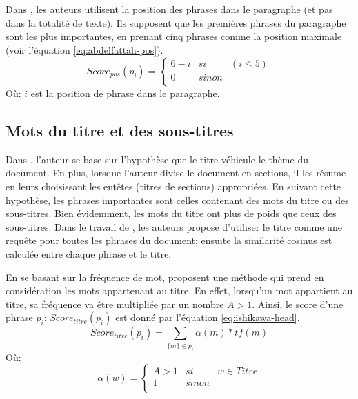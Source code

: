 \documentclass[a4paper,12pt,oneside]{../use/ESIthesis}
\begin{document}
Dans \cite{09-abdelfattah-ren}, les auteurs utilisent la position des phrases dans le paragraphe (et pas dans la totalité de texte). 
Ils supposent que les premières phrases du paragraphe sont les plus importantes, en prenant cinq phrases comme la position maximale (voir l'équation \ref{eq:abdelfattah-pos}). 
\begin{equation}
\label{eq:abdelfattah-pos}
Score_{pos}(p_i) = \left\lbrace 
\begin{array}{lll}
6 - i & si & (i \leq 5)\\
0 & sinon &  \\
\end{array}
\right. 
\end{equation}
Où: $ i $ est la position de phrase dans le paragraphe.

\subsection{Mots du titre et des sous-titres}

Dans \cite{69-edmundson}, l'auteur se base sur l'hypothèse que le titre véhicule le thème du document.
En plus, lorsque l'auteur divise le document en sections, il les résume en leurs choisissant les entêtes (titres de sections) appropriées. 
En suivant cette hypothèse, les phrases importantes sont celles contenant des mots du titre ou des sous-titres.
Bien évidemment, les mots du titre ont plus de poids que ceux des sous-titres.
Dans le travail de \cite{88-salton-buckley}, les auteurs propose d'utiliser le titre comme une requête pour toutes les phrases du document; ensuite la similarité cosinus est calculée entre chaque phrase et le titre. 

En se basant sur la fréquence de mot, \cite{01-ishikawa-al} proposent une méthode qui prend en considération les mots appartenant au titre. 
En effet, lorsqu'un mot appartient au titre, sa fréquence va être multipliée par un nombre $ A > 1 $. 
Ainsi, le score d'une phrase $ p_i $: $ Score_{titre}(p_i) $ est donné par l'équation \ref{eq:ishikawa-head}.
\begin{equation}
\label{eq:ishikawa-head}
Score_{titre}(p_i) = \sum_{\{m\} \in p_i}{\alpha(m) * tf(m)}
\end{equation}
Où: 
\begin{equation}
\label{eq:ishikawa-head2}
\alpha(w) = \left\lbrace 
\begin{array}{lll}
A > 1 & si & w \in Titre \\
1 & sinon & \\
\end{array} 
\right. 
\end{equation}
\end{document}
